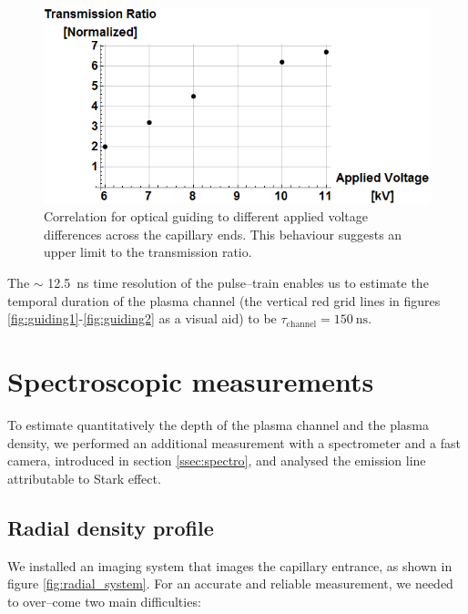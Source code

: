\documentclass[../main.tex]{subfiles}
\begin{document}
\begin{figure}
    \centering
    \includegraphics[width=\textwidth]{figures/oscillator/voltage vs guiding.png}
    \caption{Correlation for optical guiding to different applied voltage differences across the capillary ends. This behaviour suggests an upper limit to the transmission ratio.}
    \label{fig:voltagevsguiding}
\end{figure}

The $\sim$ \SI{12.5}{\ns} time resolution of the pulse--train enables us to estimate the temporal duration of the plasma channel (the vertical red grid lines in figures \ref{fig:guiding1}-\ref{fig:guiding2} as a visual aid) to be $\tau_\text{channel}=\SI{150}{\ns}$.

\section{Spectroscopic measurements}\label{sec:spectro}
To estimate quantitatively the depth of the plasma channel and the plasma density, we performed an additional measurement with a spectrometer and a fast camera, introduced in section \ref{ssec:spectro}, and analysed the emission line attributable to Stark effect.

\subsection{Radial density profile}\label{ssec:radial}
We installed an imaging system that images the capillary entrance, as shown in figure \ref{fig:radial_system}. For an accurate and reliable measurement, we needed to over--come two main difficulties:
\end{document}
